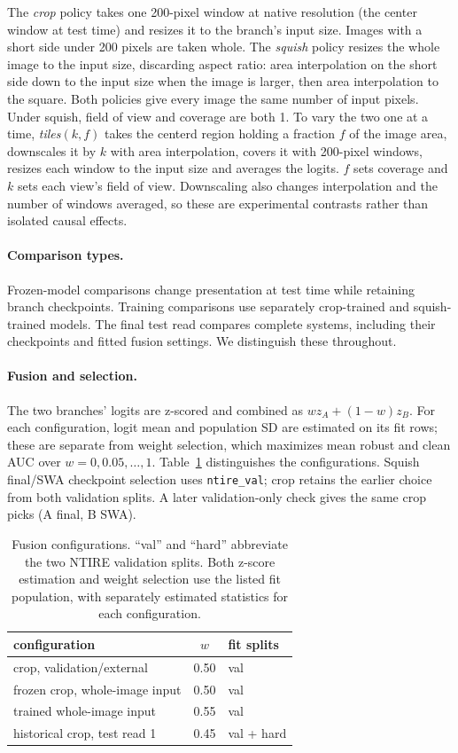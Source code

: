 \documentclass[letterpaper]{article} %
\begin{document}
The \emph{crop} policy takes one 200-pixel window at native resolution (the
center window at test time) and resizes it to the branch's input size. Images
with a short side under 200 pixels are taken whole. The \emph{squish} policy
resizes the whole image to the input size, discarding aspect ratio: area
interpolation on the short side down to the input size when the image is
larger, then area interpolation to the square. Both policies give every image
the same number of input pixels. Under squish, field of view and coverage are
both 1. To vary the two one at a time, \emph{tiles}$(k, f)$ takes the centerd
region holding a fraction $f$ of the image area, downscales it by $k$ with
area interpolation, covers it with 200-pixel windows, resizes each window to
the input size and averages the logits. $f$ sets coverage and $k$ sets each
view's field of view. Downscaling also changes interpolation and the
number of windows averaged, so these are experimental contrasts rather
than isolated causal effects.



\paragraph{Comparison types.} Frozen-model comparisons change presentation
at test time while retaining branch checkpoints. Training comparisons use
separately crop-trained and squish-trained models. The final test read
compares complete systems, including their checkpoints and fitted fusion
settings. We distinguish these throughout.

\paragraph{Fusion and selection.} The two branches' logits are z-scored and
combined as $w z_A + (1-w) z_B$. For each configuration, logit mean and population SD are estimated on its fit rows; these are separate from weight selection, which maximizes mean robust and clean AUC over $w=0,0.05,\ldots,1$. Table~\ref{tab:fusion} distinguishes the configurations. Squish final/SWA checkpoint selection uses \texttt{ntire\_val}; crop retains the earlier choice from both validation splits. A later validation-only check gives the same crop picks (A final, B SWA).

\begin{table}[t]
\centering\small
\begin{tabular}{lcl}
\toprule
configuration & $w$ & fit splits \\
\midrule
crop, validation/external & 0.50 & val \\
frozen crop, whole-image input & 0.50 & val \\
trained whole-image input & 0.55 & val \\
historical crop, test read 1 & 0.45 & val + hard \\
\bottomrule
\end{tabular}
\caption{Fusion configurations. ``val'' and ``hard'' abbreviate the two NTIRE validation splits. Both z-score estimation and weight selection use the listed fit population, with separately estimated statistics for each configuration.}
\label{tab:fusion}
\end{table}
\end{document}
